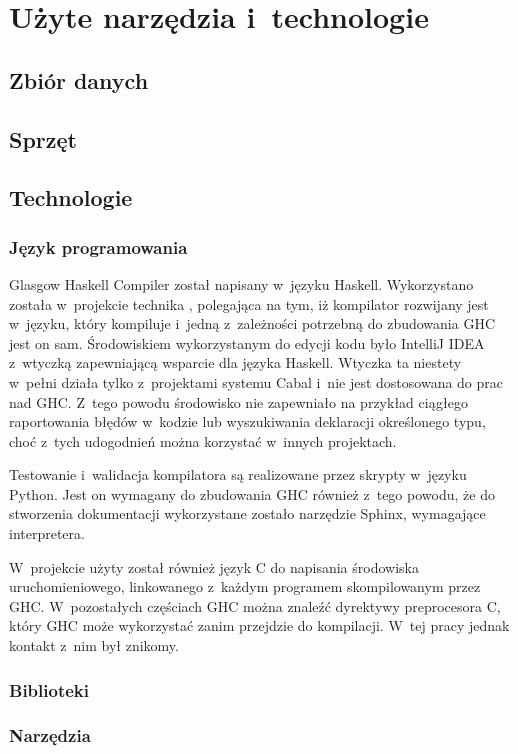 \chapter{Użyte narzędzia i~technologie}\label{chap:technologie}

\section{Zbiór danych}\label{sec:zbior_danych}


\section{Sprzęt}\label{sec:sprzet}

\section{Technologie}\label{sec:technologie}

\subsection{Język programowania}

Glasgow Haskell Compiler został napisany w~języku Haskell. Wykorzystano została
w~projekcie technika , polegająca na tym, iż kompilator
rozwijany jest w~języku, który kompiluje i~jedną z~zależności potrzebną do
zbudowania GHC jest on sam. Środowiskiem wykorzystanym do edycji kodu było
IntelliJ IDEA z~wtyczką zapewniającą wsparcie dla języka Haskell. Wtyczka ta
niestety w~pełni działa tylko z~projektami systemu Cabal i~nie jest dostosowana
do prac nad GHC. Z~tego powodu środowisko nie zapewniało na przykład ciągłego
raportowania błędów w~kodzie lub wyszukiwania deklaracji określonego typu, choć
z~tych udogodnień można korzystać w~innych projektach.

Testowanie i~walidacja kompilatora są realizowane przez skrypty w~języku
Python. Jest on wymagany do zbudowania GHC
również z~tego powodu, że do stworzenia dokumentacji wykorzystane zostało
narzędzie Sphinx, wymagające interpretera.

W~projekcie użyty został również język C do napisania środowiska
uruchomieniowego, linkowanego z~każdym programem skompilowanym przez GHC.
W~pozostałych częściach GHC można znaleźć dyrektywy preprocesora C, który GHC może
wykorzystać zanim przejdzie do kompilacji. W~tej pracy jednak kontakt z~nim był
znikomy.

\subsection{Biblioteki}

\subsection{Narzędzia}


